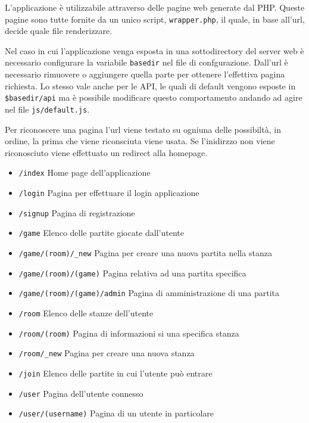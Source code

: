 L'applicazione è utilizzabile attraverso delle pagine web generate dal PHP. Queste pagine sono tutte fornite da un unico script, \texttt{wrapper.php}, il quale, in base all'url, decide quale file renderizzare.

Nel caso in cui l'applicazione venga esposta in una sottodirectory del server web è necessario configurare la variabile \texttt{basedir} nel file di confgurazione. Dall'url è necessario rimuovere o aggiungere quella parte per ottenere l'effettiva pagina richiesta. Lo stesso vale anche per le API, le quali di default vengono esposte in \texttt{\$basedir/api} ma è possibile modificare questo comportamento andando ad agire nel file \texttt{js/default.js}.

Per riconoscere una pagina l'url viene testato su ogniuna delle possibiltà, in ordine, la prima che viene riconsciuta viene usata. Se l'inidirzzo non viene riconosciuto viene effettuato un redirect alla homepage.

\begin{itemize}[noitemsep,nolistsep]
	\item \texttt{/index} Home page dell'applicazione
	\item \texttt{/login} Pagina per effettuare il login applicazione
	\item \texttt{/signup} Pagina di registrazione
	\item \texttt{/game} Elenco delle partite giocate dall'utente
	\item \texttt{/game/(room)/\_new} Pagina per creare una nuova partita nella stanza
	\item \texttt{/game/(room)/(game)} Pagina relativa ad una partita specifica
	\item \texttt{/game/(room)/(game)/admin} Pagina di amministrazione di una partita
	\item \texttt{/room} Elenco delle stanze dell'utente
	\item \texttt{/room/(room)} Pagina di informazioni si una specifica stanza
	\item \texttt{/room/\_new} Pagina per creare una nuova stanza
	\item \texttt{/join} Elenco delle partite in cui l'utente può entrare
	\item \texttt{/user} Pagina dell'utente connesso
	\item \texttt{/user/(username)} Pagina di un utente in particolare
\end{itemize}
